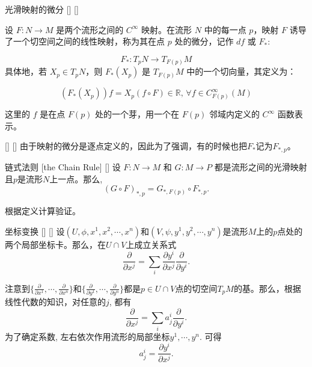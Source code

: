 \documentclass[UTF8]{ctexart}
\begin{document}
    \begin{dfn}
        []
        {光滑映射的微分}
        []
        []

        设 \( F : N \to M \) 是两个流形之间的 \( C^{\infty} \) 映射。在流形 \( N \) 中的每一点 \( p \)，映射 \( F \) 诱导了一个切空间之间的线性映射，称为其在点 \( p \) 处的微分，记作 \( df \) 或 \( F_* \):
        
        \[
            F_* : T_p N \to T_{F(p)} M
        \]
        具体地，若 \( X_p \in T_p N \)，则 \( F_{*}(X_p) \) 是 \( T_{F(p)} M \) 中的一个切向量，其定义为：
        
        \[
            (F_*(X_p)) f = X_p(f \circ F) \in \mathbb{R}, \, \forall f \in C^{\infty}_{F(p)}(M)
        \]
        
        这里的 \( f \) 是在点 \( F(p) \) 处的一个芽，用一个在 \( F(p) \) 邻域内定义的 \( C^{\infty} \) 函数表示。
    \end{dfn}

    \begin{rmk}
        []
        {}
        []
        []
        由于映射的微分是逐点定义的，因此为了强调，有的时候也把$F_{*}$记为$F_{*,p}$。
    \end{rmk}

    \begin{ppt}
        []
        {链式法则}
        [the Chain Rule]
        []
        设 \( F : N \to M \) 和 \( G : M \to P \) 都是流形之间的光滑映射且$p$是流形$N$上一点。那么,
        \[
        (G \circ F)_{*,p} = G_{*,F(p)} \circ F_{*,p}.
        \]
    \end{ppt}

    \begin{prf}
        
        
        
        

        根据定义计算验证。  
    \end{prf}

    \begin{ppt}
        []
        {坐标变换}
        []
        []
        设$(U, \phi, x^1, x^2, \cdots, x^n)$和$(V, \psi, y^1, y^2, \cdots, y^n)$是流形$M$上的$p$点处的两个局部坐标卡。那么，在$U \cap V$上成立关系式
        \[
            \frac{\partial}{\partial x^j} = \sum_{i}\frac{\partial y^i}{\partial x^j}\frac{\partial}{\partial y^i}.
        \]
    \end{ppt}

    \begin{prf}
        
        
        
        

        注意到$\{\frac{\partial}{\partial x^1}, \cdots, \frac{\partial}{\partial x^n}\}$和$\{\frac{\partial}{\partial y^1}, \cdots, \frac{\partial}{\partial y^n}\}$都是$p \in U \cap V$点的切空间$T_p M$的基。那么，根据线性代数的知识，对任意的$j$, 都有
        \[
            \frac{\partial}{\partial x^j} = \sum_{i} a^i_j
            \frac{\partial}{\partial y^i}.
        \]
        为了确定系数, 左右依次作用流形的局部坐标$y^1, \cdots, y^n$. 可得
        \[
            a^i_j = 
            \frac{\partial y^i}{\partial x^j}.
        \]
    \end{prf}
    
\end{document}

